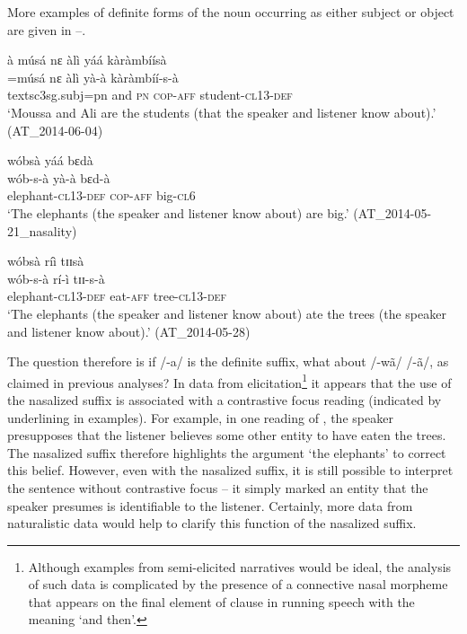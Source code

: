 \documentclass[output=paper]{langsci/langscibook}
\begin{document}
More examples of definite forms of the noun occurring as either subject or object are given in –.

\ea\label{ex:teo:42}
à músá nɛ àlì yáá kàràmbíísà\\
\gll =músá nɛ àlì yà-à kàràmbíí-s-à \\
textsc{3sg.subj=pn} and \textsc{pn} \textsc{cop-aff} student-\textsc{cl13-def} \\
\glt ‘Moussa and Ali are the students (that the speaker and listener know about).’ (AT\_2014-06-04)
\z

\ea\label{ex:teo:43}
wóbsà yáá bɛdà\\
\gll wób-s-à yà-à bɛd-à\\
elephant-\textsc{cl13-def} \textsc{cop-aff} big-\textsc{cl6}\\
\glt ‘The elephants (the speaker and listener know about) are big.’ (AT\_2014-05-21\_nasality)
\z

\ea\label{ex:teo:44}

wóbsà ríì tɪɪsà\\
\gll wób-s-à rí-ì tɪɪ-s-à\\
elephant-\textsc{cl13-def} eat-\textsc{aff} tree-\textsc{cl13-def}\\
\glt ‘The elephants (the speaker and listener know about) ate the trees (the speaker and listener know about).’ (AT\_2014-05-28)
\z

The question therefore is if /-a/ is the definite suffix, what about /-wã/ {\Tilde} /-ã/, as claimed in previous analyses? In data from elicitation\footnote{Although examples from semi-elicited narratives would be ideal, the analysis of such data is complicated by the presence of a connective nasal morpheme that appears on the final element of clause in running speech with the meaning ‘and then’.} it appears that the use of the nasalized suffix is associated with a contrastive focus reading (indicated by underlining in examples). For example, in one reading of , the speaker presupposes that the listener believes some other entity to have eaten the trees. The nasalized suffix therefore highlights the argument ‘the elephants’ to correct this belief. However, even with the nasalized suffix, it is still possible to interpret the sentence without contrastive focus – it simply marked an entity that the speaker presumes is identifiable to the listener. Certainly, more data from naturalistic data would help to clarify this function of the nasalized suffix.

\ea\label{ex:teo:45}
\end{document}
